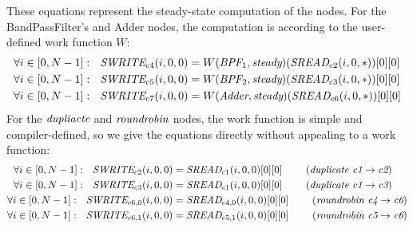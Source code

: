 These equations represent the steady-state computation of the nodes.
For the BandPassFilter's and Adder nodes, the computation is according
to the user-defined work function $W$:
\begin{align*}
\forall i \in [0, N-1]:~~\mbox{\it SWRITE}_{c4}(i,0,0) &= W(\mbox{\it BPF}_1, \mbox{\it steady})(\mbox{\it SREAD}_{c2}(i, 0, *))[0][0] \\
\forall i \in [0, N-1]:~~\mbox{\it SWRITE}_{c5}(i,0,0) &= W(\mbox{\it BPF}_2, \mbox{\it steady})(\mbox{\it SREAD}_{c3}(i, 0, *))[0][0] \\
\forall i \in [0, N-1]:~~\mbox{\it SWRITE}_{c7}(i,0,0) &= W(\mbox{\it Adder}, \mbox{\it steady})(\mbox{\it SREAD}_{c6}(i, 0, *))[0][0]
\end{align*}
For the $\mbox{\it dupliacte}$ and $\mbox{\it roundrobin}$ nodes, the work
function is simple and compiler-defined, so we give the equations
directly without appealing to a work function:
\begin{align*}
\forall i \in [0, N-1]:~~\mbox{\it SWRITE}_{c2}(i,0,0) &= \mbox{\it SREAD}_{c1}(i, 0, 0)[0][0]~~~~~~~(\mbox{\it duplicate c1} \rightarrow \mbox{\it c2}) \\
\forall i \in [0, N-1]:~~\mbox{\it SWRITE}_{c3}(i,0,0) &= \mbox{\it SREAD}_{c1}(i, 0, 0)[0][0]~~~~~~~(\mbox{\it duplicate c1} \rightarrow \mbox{\it c3}) \\
\forall i \in [0, N-1]:~~\mbox{\it SWRITE}_{{c6}, 0}(i,0,0) &= \mbox{\it SREAD}_{{c4}, 0}(i, 0, 0)[0][0]~~~~~~~(\mbox{\it roundrobin c4} \rightarrow \mbox{\it c6}) \\
\forall i \in [0, N-1]:~~\mbox{\it SWRITE}_{{c6}, 1}(i,0,0) &= \mbox{\it SREAD}_{{c5}, 1}(i, 0, 0)[0][0]~~~~~~~(\mbox{\it roundrobin c5} \rightarrow \mbox{\it c6})
\end{align*}


